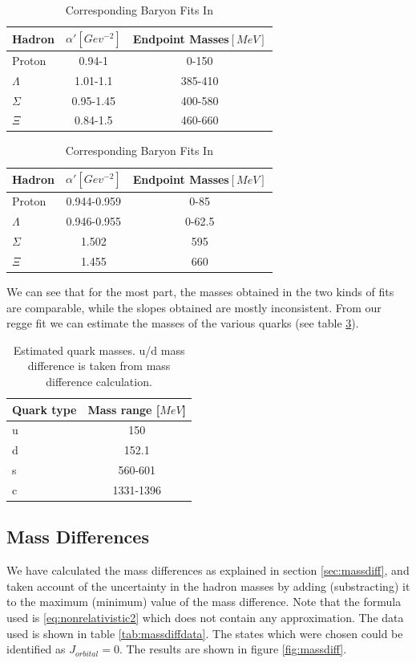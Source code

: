 \documentclass[11pt,a4paper]{article}
\begin{document}
\begin{table}
\centering
\begin{tabular}{|l|c|c|}
\hline
Hadron & $\alpha '\left[Gev^{-2}\right]$ & Endpoint Masses$\left[MeV\right]$ \\ \hline
Proton & 0.94-1 & 0-150 \\
$\Lambda$ & 1.01-1.1 & 385-410 \\
$\Sigma$ & 0.95-1.45 & 400-580 \\
$\Xi$  & 0.84-1.5 & 460-660 \\
\hline
\end{tabular}
\caption{Baryon Fits Summary Table}
\label{tab:baryonsum}

\centering
\begin{tabular}{|l|c|c|}
\hline
Hadron & $\alpha '\left[Gev^{-2}\right]$ & Endpoint Masses$\left[MeV\right]$ \\ \hline
Proton & 0.944-0.959 & 0-85 \\
$\Lambda$ & 0.946-0.955 & 0-62.5 \\
$\Sigma$ & 1.502 & 595 \\
$\Xi$  & 1.455 & 660 \\
\hline
\end{tabular}
\caption{Corresponding Baryon Fits In \cite{Sonnenschein15}}
\label{tab:baryonsumdorin}
\end{table}

We can see that for the most part, the masses obtained in the two kinds of fits are comparable, while the slopes obtained are mostly inconsistent. From our regge fit we can estimate the masses of the various quarks  (see table \ref{tab:quarkmasses}).

\begin{table}
\centering
\begin{tabular}{|l|c|}
\hline
Quark type & Mass range [$MeV$] \\ \hline
u & 150\\ \hline
d & 152.1 \\ \hline
s & 560-601\\ \hline
c & 1331-1396\\ \hline
\end{tabular}
\caption{Estimated quark masses. u/d mass difference is taken from mass difference calculation.}
\label{tab:quarkmasses}
\end{table}

\FloatBarrier
\subsection{Mass Differences}
\label{sec:confrontmassdiff}
We have calculated the mass differences as explained in section \ref{sec:massdiff}, and taken account of the uncertainty in the hadron masses by adding (substracting) it to the maximum (minimum) value of the mass difference. Note that the formula used is \ref{eq:nonrelativistic2} which does not contain any approximation. The data used is shown in table \ref{tab:massdiffdata}. The states   which were chosen could be identified as $J_{orbital}=0$. The results are shown in figure \ref{fig:massdiff}.
\end{document}

